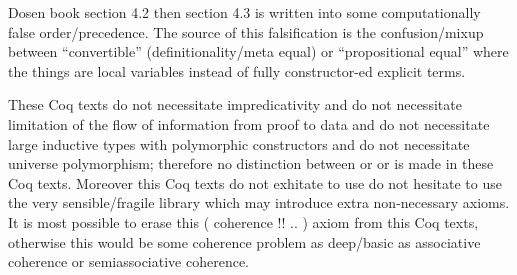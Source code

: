     Dosen book \cite{dosen} section 4.2 then section 4.3 is written into some computationally false order/precedence. The source of this falsification is the confusion/mixup between ``convertible'' (definitionality/meta equal) or ``propositional equal'' where the things are local variables instead of fully constructor-ed explicit terms.


    These Coq texts do not necessitate impredicativity and do not necessitate limitation of the flow of information from proof to data and do not necessitate large inductive types with polymorphic constructors and do not necessitate universe polymorphism; therefore no distinction between  or  or  is made in these Coq texts. Moreover this Coq texts do not exhitate to use do not hesitate to use the very sensible/fragile library    which may introduce extra non-necessary  axioms. It is most possible to erase this  ( coherence !! .. ) axiom from this Coq texts, otherwise this would be some coherence problem as deep/basic as associative coherence or semiassociative coherence.


